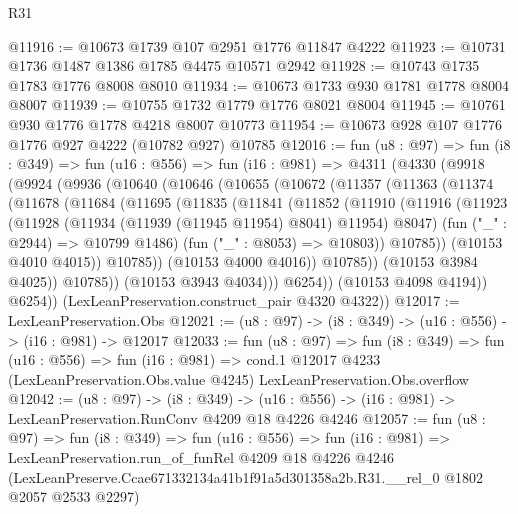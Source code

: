 \begin{lexlean}{R31}
\begin{coremodule}
@11916 := @10673 @1739 @107 @2951 @1776 @11847 @4222
@11923 := @10731 @1736 @1487 @1386 @1785 @4475 @10571 @2942
@11928 := @10743 @1735 @1783 @1776 @8008 @8010
@11934 := @10673 @1733 @930 @1781 @1778 @8004 @8007
@11939 := @10755 @1732 @1779 @1776 @8021 @8004
@11945 := @10761 @930 @1776 @1778 @4218 @8007 @10773
@11954 := @10673 @928 @107 @1776 @1776 @927 @4222 (@10782 @927) @10785
@12016 := fun (u8 : @97) =>
  fun (i8 : @349) =>
  fun (u16 : @556) =>
  fun (i16 : @981) =>
  @4311
    (@4330
      (@9918
        (@9924
          (@9936
            (@10640
              (@10646
                (@10655
                  (@10672
                    (@11357
                      (@11363
                        (@11374
                          (@11678
                            (@11684
                              (@11695
                                (@11835
                                  (@11841
                                    (@11852
                                      (@11910
                                        (@11916
                                          (@11923
                                            (@11928
                                              (@11934 (@11939 (@11945 @11954) @8041) @11954)
                                              @8047)
                                            (fun ("_" : @2944) => @10799 @1486)
                                            (fun ("_" : @8053) => @10803))
                                          @10785))
                                      (@10153 @4010 @4015))
                                    @10785))
                                (@10153 @4000 @4016))
                              @10785))
                          (@10153 @3984 @4025))
                        @10785))
                    (@10153 @3943 @4034)))
                @6254))
            (@10153 @4098 @4194))
          @6254))
      (LexLeanPreservation.construct_pair @4320 @4322))
@12017 := LexLeanPreservation.Obs
@12021 := (u8 : @97) -> (i8 : @349) -> (u16 : @556) -> (i16 : @981) -> @12017
@12033 := fun (u8 : @97) =>
  fun (i8 : @349) =>
  fun (u16 : @556) =>
  fun (i16 : @981) =>
  cond.{1} @12017 @4233 (LexLeanPreservation.Obs.value @4245) LexLeanPreservation.Obs.overflow
@12042 := (u8 : @97) ->
  (i8 : @349) -> (u16 : @556) -> (i16 : @981) -> LexLeanPreservation.RunConv @4209 @18 @4226 @4246
@12057 := fun (u8 : @97) =>
  fun (i8 : @349) =>
  fun (u16 : @556) =>
  fun (i16 : @981) =>
  LexLeanPreservation.run_of_funRel
    @4209
    @18
    @4226
    @4246
    (LexLeanPreserve.Ccae671332134a41b1f91a5d301358a2b.R31.__rel_0 @1802 @2057 @2533 @2297)
\end{coremodule}
\end{lexlean}
